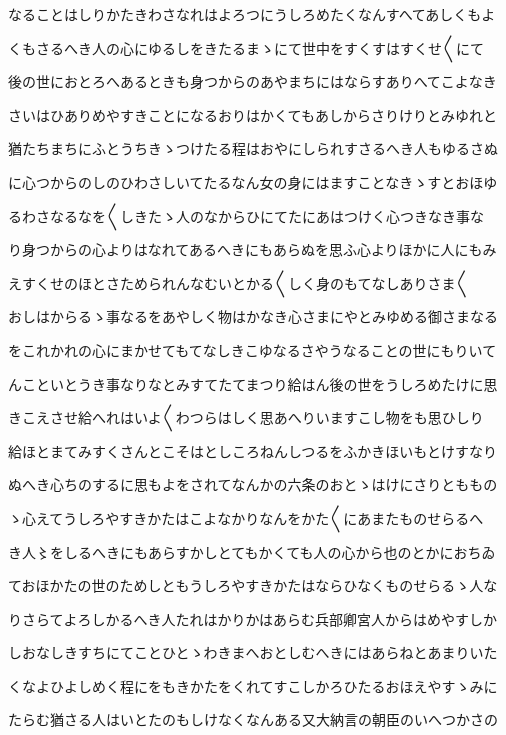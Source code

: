 \documentclass[a4paper,11pt,landscape]{ltjtarticle}
\begin{document}
なることはしりかたきわさなれはよろつにうしろめたくなんすへてあしくもよ
\par\medskip
くもさるへき人の心にゆるしをきたるまゝにて世中をすくすはすくせ〱にて
\par\medskip
後の世におとろへあるときも身つからのあやまちにはならすありへてこよなき
\par\medskip
さいはひありめやすきことになるおりはかくてもあしからさりけりとみゆれと
\par\medskip
猶たちまちにふとうちきゝつけたる程はおやにしられすさるへき人もゆるさぬ
\par\medskip
に心つからのしのひわさしいてたるなん女の身にはますことなきゝすとおほゆ
\par\medskip
るわさなるなを〱しきたゝ人のなからひにてたにあはつけく心つきなき事な
\par\medskip
り身つからの心よりはなれてあるへきにもあらぬを思ふ心よりほかに人にもみ
\par\medskip
えすくせのほとさためられんなむいとかる〱しく身のもてなしありさま〱
\par\medskip
おしはからるゝ事なるをあやしく物はかなき心さまにやとみゆめる御さまなる
\par\medskip
をこれかれの心にまかせてもてなしきこゆなるさやうなることの世にもりいて
\par\medskip
んこといとうき事なりなとみすてたてまつり給はん後の世をうしろめたけに思
\par\medskip
きこえさせ給へれはいよ〱わつらはしく思あへりいますこし物をも思ひしり
\par\medskip
給ほとまてみすくさんとこそはとしころねんしつるをふかきほいもとけすなり
\par\medskip
ぬへき心ちのするに思もよをされてなんかの六条のおとゝはけにさりとももの
\par\medskip
ゝ心えてうしろやすきかたはこよなかりなんをかた〱にあまたものせらるへ
\par\medskip
き人〻をしるへきにもあらすかしとてもかくても人の心から也のとかにおちゐ
\par\medskip
ておほかたの世のためしともうしろやすきかたはならひなくものせらるゝ人な
\par\medskip
りさらてよろしかるへき人たれはかりかはあらむ兵部卿宮人からはめやすしか
\par\medskip
しおなしきすちにてことひとゝわきまへおとしむへきにはあらねとあまりいた
\par\medskip
くなよひよしめく程にをもきかたをくれてすこしかろひたるおほえやすゝみに
\par\medskip
たらむ猶さる人はいとたのもしけなくなんある又大納言の朝臣のいへつかさの
\end{document}
